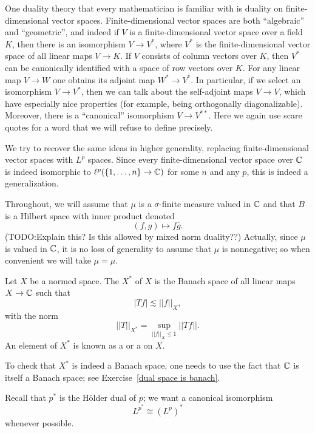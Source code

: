 One duality theory that every mathematician is familiar with is duality on finite-dimensional vector spaces.
Finite-dimensional vector spaces are both ``algebraic'' and ``geometric'', and indeed if $V$ is a finite-dimensional vector space over a field $K$, then there is an isomorphism $V \to V^{*}$, where $V^{*}$ is the finite-dimensional vector space of all linear maps $V \to K$.
If $V$ consists of column vectors over $K$, then $V^{*}$ can be canonically identified with a space of row vectors over $K$.
For any linear map $V \to W$ one obtains its adjoint map $W^{*} \to V^{*}$.
In particular, if we select an isomorphism $V \to V^{*}$, then we can talk about the self-adjoint maps $V \to V$, which have especially nice properties (for example, being orthogonally diagonalizable).
Moreover, there is a ``canonical'' isomorphism $V \to V^{**}$.
Here we again use scare quotes for a word that we will refuse to define precisely.

We try to recover the same ideas in higher generality, replacing finite-dimensional vector spaces with $L^{p}$ spaces.
Since every finite-dimensional vector space over $\mathbb{C}$ is indeed isomorphic to $\ell^{p}(\{1, \dots, n\} \to \mathbb{C})$ for some $n$ and any $p$, this is indeed a generalization.

Throughout, we will assume that $\mu$ is a $\sigma$-finite measure valued in $\mathbb{C}$ and that $B$ is a Hilbert space with inner product denoted
\[(f, g) \mapsto f \overline g.\]
(TODO:\@ Explain this? Is this allowed by mixed norm duality??)
Actually, since $\mu$ is valued in $\mathbb{C}$, it is no loss of generality to assume that $\mu$ is nonnegative; so when convenient we will take $\mu = \mu$.

\begin{definition}
Let $X$ be a normed space.
The  $X^{*}$ of $X$ is the Banach space of all linear maps $X \to \mathbb{C}$ such that
\begin{equation}\label{bounded covector}
|Tf| \lesssim ||f||_{X},
\end{equation}
with the norm
\[||T||_{X^{*}} = \sup_{||f||_{X} \leq 1} ||Tf||.\]
An element of $X^{*}$ is known as a  or a  on $X$.
\end{definition}

To check that $X^{*}$ is indeed a Banach space, one needs to use the fact that $\mathbb{C}$ is itself a Banach space; see Exercise~\ref{dual space is banach}.

Recall that $p^{*}$ is the H\"older dual of $p$; we want a canonical isomorphism
\[L^{p^{*}} \cong {(L^{p})}^{*}\]
whenever possible.

